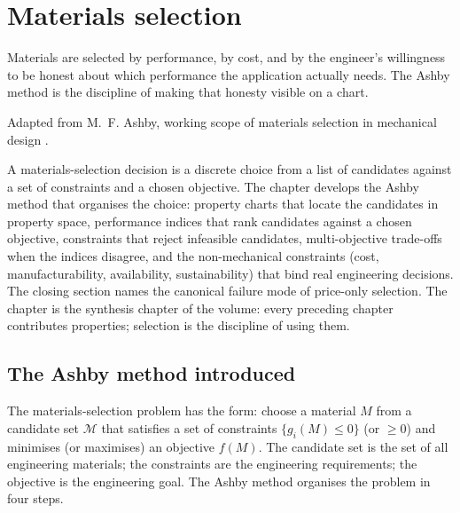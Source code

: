 \chapter{Materials selection}
\label{vol05:ch10}

\epigraph{Materials are selected by performance, by cost, and by the
engineer's willingness to be honest about which performance the
application actually needs. The Ashby method is the discipline of
making that honesty visible on a chart.}{Adapted from M.~F. Ashby,
working scope of materials selection in mechanical design \cite[ch.~1,
pp.~1--13]{text:ashby2017}.}


\noindent
A materials-selection decision is a discrete choice from a list of
candidates against a set of constraints and a chosen objective. The
chapter develops the Ashby method that organises the choice: property
charts that locate the candidates in property space, performance
indices that rank candidates against a chosen objective, constraints
that reject infeasible candidates, multi-objective trade-offs when the
indices disagree, and the non-mechanical constraints (cost,
manufacturability, availability, sustainability) that bind real
engineering decisions. The closing section names the canonical failure
mode of price-only selection. The chapter is the synthesis chapter of
the volume: every preceding chapter contributes properties; selection
is the discipline of using them.

\section{The Ashby method introduced}

The materials-selection problem has the form: choose a material
$M$ from a candidate set $\mathcal{M}$ that satisfies a set of
constraints $\{g_i(M) \leq 0\}$ (or $\geq 0$) and minimises (or
maximises) an objective $f(M)$. The candidate set is the set of all
engineering materials; the constraints are the engineering
requirements; the objective is the engineering goal. The Ashby method
\cite[ch.~3]{text:ashby2017} organises the problem in four steps.

